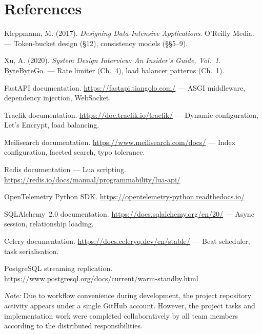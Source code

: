 \documentclass[12pt,a4paper]{article}
\begin{document}
\section{References}

\begin{enumerate}[leftmargin=*, label={[\arabic*]}]

\item Kleppmann, M. (2017). \textit{Designing Data-Intensive Applications}. O'Reilly Media. --- Token-bucket design (\S12), consistency models (\S\S5--9).

\item Xu, A. (2020). \textit{System Design Interview: An Insider's Guide, Vol.~1}. ByteByteGo. --- Rate limiter (Ch.~4), load balancer patterns (Ch.~1).

\item FastAPI documentation. \url{https://fastapi.tiangolo.com/} --- ASGI middleware, dependency injection, WebSocket.

\item Traefik documentation. \url{https://doc.traefik.io/traefik/} --- Dynamic configuration, Let's Encrypt, load balancing.

\item Meilisearch documentation. \url{https://www.meilisearch.com/docs/} --- Index configuration, faceted search, typo tolerance.

\item Redis documentation --- Lua scripting. \url{https://redis.io/docs/manual/programmability/lua-api/}

\item OpenTelemetry Python SDK. \url{https://opentelemetry-python.readthedocs.io/}

\item SQLAlchemy~2.0 documentation. \url{https://docs.sqlalchemy.org/en/20/} --- Async session, relationship loading.

\item Celery documentation. \url{https://docs.celeryq.dev/en/stable/} --- Beat scheduler, task serialisation.

\item PostgreSQL streaming replication. \url{https://www.postgresql.org/docs/current/warm-standby.html}

\end{enumerate}

\vspace{2em}
\noindent
\textit{Note:} Due to workflow convenience during development, the project repository activity appears under a single GitHub account. However, the project tasks and implementation work were completed collaboratively by all team members according to the distributed responsibilities.
\end{document}

